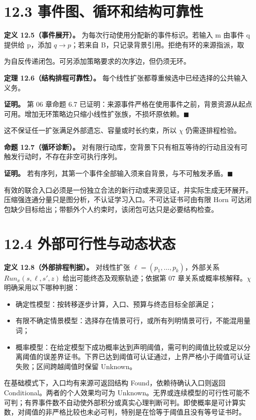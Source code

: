 \documentclass[UTF8,a4paper,zihao=-4,fontset=windows,openany]{ctexbook}
\newcommand{\mcsdisplay}[1]{%
  \par\addvspace{0.7em}%
  \sbox{\mcsmathbox}{\ensuremath{\displaystyle #1}}%
  \ifdim\wd\mcsmathbox>\linewidth
    \noindent\resizebox{\linewidth}{!}{\usebox{\mcsmathbox}}%
  \else
    \noindent\hspace*{\fill}\usebox{\mcsmathbox}\hspace*{\fill}%
  \fi
  \par\addvspace{0.7em}%
}
\def\ensuremath#1{#1}%
\def\mathrm#1{#1}%
\begin{document}
\section{12.3 事件图、循环和结构可靠性}
\textbf{定义 12.5（事件展开）。} 为每次行动使用分配新的事件标识。若输入 m 由事件 q 提供给 p，添加 \(q\to p\)；若来自 B，只记录背景引用。拒绝有环的来源指派，取


\mcsdisplay{\preceq=(\to)^*}
\noindent 为自反传递闭包。可另添加策略要求的次序边，但仍须无环。

\textbf{定理 12.6（结构排程可靠性）。} 每个线性扩张都尊重候选中已经选择的公共输入义务。

\textbf{证明。} 第 06 章命题 6.7 已证明：来源事件严格在使用事件之前，背景资源从起点可用。增加无环策略边只缩小线性扩张族，不损坏原依赖。\(\blacksquare\)

这不保证任一扩张满足外部遗忘、容量或时长约束，所以 \(\chi\) 仍需逐排程检验。

\textbf{命题 12.7（循环诊断）。} 对有限行动库，空背景下只有相互等待的行动且没有可触发行动时，不存在非空可执行序列。

\textbf{证明。} 若有序列，其第一个事件全部输入须来自背景，与不可触发矛盾。\(\blacksquare\)

有效的联合入口必须是一份独立合法的新行动或来源见证，并实际生成无环展开。压缩强连通分量只是图分析，不认证学习入口。不可达证书可由有限 Horn 可达闭包缺少目标给出；带额外个人约束时，该闭包可达只是必要结构检查。

\section{12.4 外部可行性与动态状态}
\textbf{定义 12.8（外部排程判据）。} 对线性扩张 \(\ell=(p_{1},\ldots,p_k)\)，外部关系 \(\mathrm{Run}_x(s,\ell,s',z)\) 给出可能终态及观察轨迹；依据第 07 章关系或概率核解释。\(\chi\) 明确采用以下哪种判据：

\begin{itemize}
\item 确定性模型：按转移逐步计算，入口、预算与终态目标全部满足；
\item 有限不确定情景模型：选择存在情景可行，或所有列明情景可行，不能混用量词；
\item 概率模型：在给定模型下成功概率达到声明阈值，需可判的阈值比较或足以分离阈值的误差界证书。下界已达到阈值可认证通过，上界严格小于阈值可认证失败；区间跨越阈值时保留 Unknown。
\end{itemize}
在基础模式下，入口均有来源可返回结构 Found，依赖待确认入口则返回 Conditional。两者的个人效果均可为 Unknown。无界或连续模型的可行性可能不可判；有界事件数不自动使外部积分或真实心理判断可判。即使概率是可计算实数，对阈值的非严格比较也未必可判，特别是在恰等于阈值且没有等号证书时。
\end{document}
